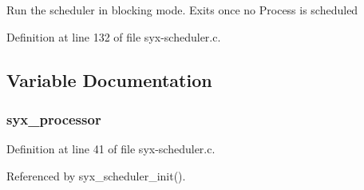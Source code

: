Run the scheduler in blocking mode. Exits once no Process is scheduled 

Definition at line 132 of file syx-scheduler.c.

\subsection{Variable Documentation}
\hypertarget{syx-scheduler_8c_cd76972884d834c2095b727889851064}{
\subsubsection{ {\bf syx\_\-processor}}}
\label{syx-scheduler_8c_cd76972884d834c2095b727889851064}




Definition at line 41 of file syx-scheduler.c.

Referenced by syx\_\-scheduler\_\-init().